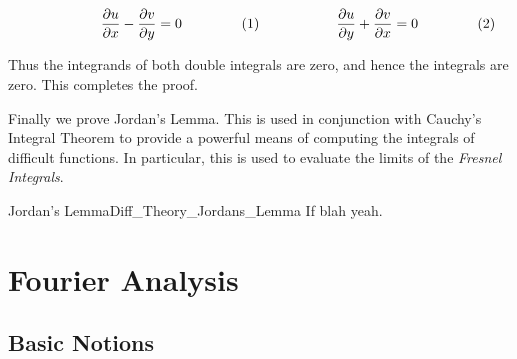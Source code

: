 \documentclass[crop=false,class=book,oneside]{standalone}
\begin{document}
\begin{bproof}
                \begin{subequations}
                    \begin{minipage}{0.49\textwidth}
                        \begin{equation}
                            \frac{\partial{u}}{\partial{x}}-
                            \frac{\partial{v}}{\partial{y}}=0
                        \end{equation}
                    \end{minipage}
                    \hfill
                    \begin{minipage}{0.49\textwidth}
                        \begin{equation}
                            \frac{\partial{u}}{\partial{y}}+
                            \frac{\partial{v}}{\partial{x}}=0
                        \end{equation}
                    \end{minipage}
                \end{subequations}
                \par\hfill\par
                Thus the integrands of both double integrals are zero,
                and hence the integrals are zero. This completes the proof.
            \end{bproof}
            Finally we prove Jordan's Lemma. This is used in conjunction
            with Cauchy's Integral Theorem to provide a powerful means of
            computing the integrals of difficult functions. In particular, this
            is used to evaluate the limits of the \textit{Fresnel Integrals}.
            \begin{ftheorem}{Jordan's Lemma}{Diff_Theory_Jordans_Lemma}
                If blah yeah.
            \end{ftheorem}
    \section{Fourier Analysis}
        \subsection{Basic Notions}
\end{document}
